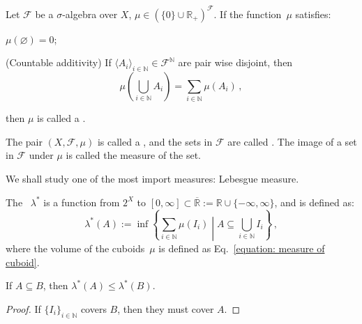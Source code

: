 \documentclass[openany]{book}
\begin{document}
\begin{definition}[Measure]
	Let $\mathscr F$ be a $\sigma$-algebra over $X$, $\mu \in (\{0\} \cup \mathbb R_+)^\mathscr F$. 
	If the function~$\mu$ satisfies:
	\begin{conditionlist}
		\item $\mu(\varnothing) = 0$;
		\item (Countable additivity) If $\langle A_i\rangle_{i \in \mathbb N} \in \mathscr F^\mathbb N$ are pair wise disjoint, then
		\begin{equation*}
			\mu \left( 
				\bigcup_{i \in \mathbb N} A_i 
			 \right) = \sum_{i \in \mathbb N} \mu(A_i)\,,
		\end{equation*}
	\end{conditionlist}
		then $\mu$ is called a .

		The pair $(X, \mathscr F, \mu)$ is called a , and the sets in $\mathscr F$ are called .
		The image of a set in $\mathscr F$ under $\mu$ is called the measure of the set.
	
\end{definition}

We shall study one of the most import measures: Lebesgue measure. 

\begin{definition}
	The ~$\lambda^*$ is a function from $2^X$ to $[0, \infty] \subset \overline{\mathbb R} := \mathbb R \cup \{-\infty, \infty\}$, and is defined as:
	\begin{equation*}
		\lambda^*(A) := \inf \left\{
			\sum_{i \in \mathbb N} \mu(I_i) 
		\middle|
			A \subseteq \bigcup_{i \in \mathbb N} I_i 
		\right\}\,,
	\end{equation*}
	where the volume of the cuboids~$\mu$ is defined as Eq.~\eqref{equation: measure of cuboid}.
\end{definition}

\begin{theorem}
	\label{theorem: monotone of Lebesgue outer measure}
	If $A \subseteq B$, then $\lambda^*(A) \leq \lambda^*(B)$.
\end{theorem}
\begin{proof}
	If $\{I_i\}_{i \in \mathbb N}$ covers $B$, then they must cover $A$.
\end{proof}
\end{document}
